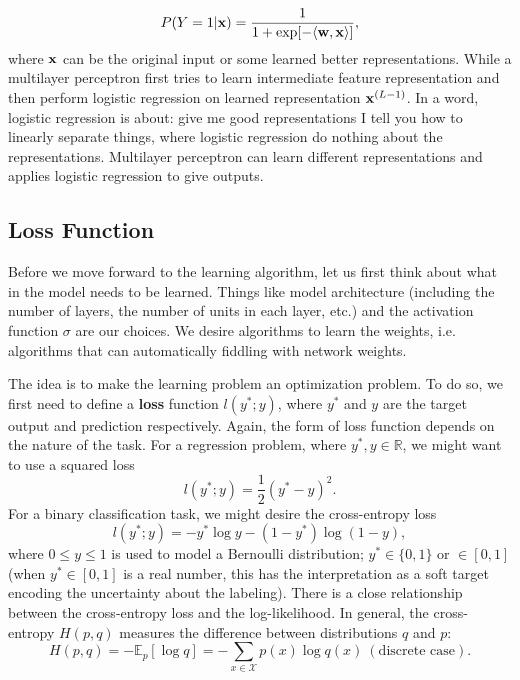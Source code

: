 \documentclass[../main.tex]{subfiles}
\begin{document}
\begin{equation*}
P(Y=1|{\bf x})=\frac{1}{1+\exp[-\langle{\bf w,x}\rangle]},
\end{equation*}
where ${\bf x}$ can be the original input or some learned better representations. While a multilayer perceptron first tries to learn intermediate feature representation and then perform logistic regression on learned representation ${\bf x}^{(L-1)}$. In a word, logistic regression is about: give me good representations I tell you how to linearly separate things, where logistic regression do nothing about the representations. Multilayer perceptron can learn different representations and applies logistic regression to give outputs.
\subsection{Loss Function}
Before we move forward to the learning algorithm, let us first think about what in the model needs to be learned. Things like model architecture (including the number of layers, the number of units in each layer, etc.) and the activation function $\sigma$ are our choices. We desire algorithms to learn the weights, i.e. algorithms that can automatically fiddling with network weights. 
\par The idea is to make the learning problem an optimization problem. To do so, we first need to define a \textbf{loss} function $l(y^*;y)$, where $y^*$ and $y$ are the target output and prediction respectively. Again, the form of loss function depends on the nature of the task. For a regression problem, where $y^*,y\in \mathbb{R}$, we might want to use a squared loss
\begin{equation*}
l(y^*;y)=\frac{1}{2}(y^*-y)^2.
\end{equation*}
For a binary classification task, we might desire the cross-entropy loss
\begin{equation*}
l(y^*;y)=-y^*\log y-(1-y^*)\log(1-y),
\end{equation*}
where $0\leq y\leq 1$ is used to model a Bernoulli distribution; $y^*\in \{0,1\}$ or $\in [0,1]$ (when $y^*\in [0,1]$ is a real number, this has the interpretation as a soft target encoding the uncertainty about the labeling). There is a close relationship between the cross-entropy loss and the log-likelihood. In general, the cross-entropy $H(p,q)$ measures the difference between distributions $q$ and $p$:
\begin{equation*}
H(p,q)=-\mathbb{E}_p[\log q]=-\sum_{x\in\mathcal{X}}p(x)\log q(x)\ (\text{discrete case}).
\end{equation*}
\end{document}
